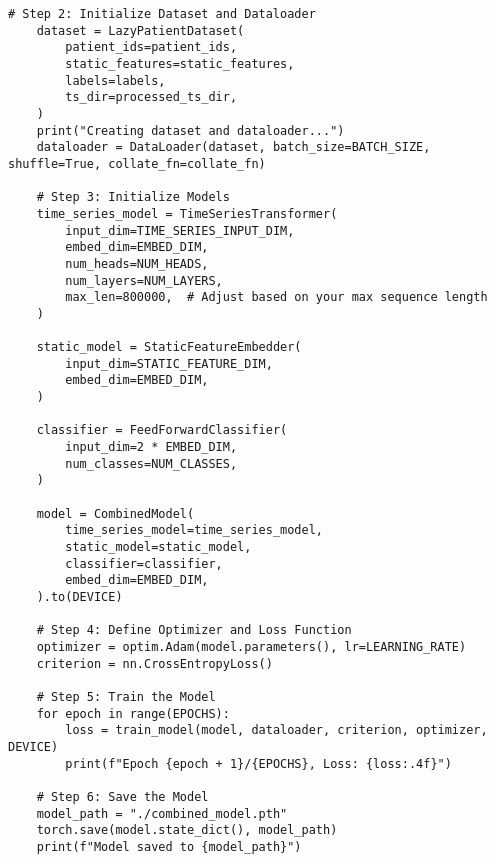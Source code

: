 \begin{appendices}
\begin{mdframed}
\begin{lstlisting}[breaklines=true]
    # Step 2: Initialize Dataset and Dataloader
    dataset = LazyPatientDataset(
        patient_ids=patient_ids,
        static_features=static_features,
        labels=labels,
        ts_dir=processed_ts_dir,
    )
    print("Creating dataset and dataloader...")
    dataloader = DataLoader(dataset, batch_size=BATCH_SIZE, shuffle=True, collate_fn=collate_fn)

    # Step 3: Initialize Models
    time_series_model = TimeSeriesTransformer(
        input_dim=TIME_SERIES_INPUT_DIM,
        embed_dim=EMBED_DIM,
        num_heads=NUM_HEADS,
        num_layers=NUM_LAYERS,
        max_len=800000,  # Adjust based on your max sequence length
    )

    static_model = StaticFeatureEmbedder(
        input_dim=STATIC_FEATURE_DIM,
        embed_dim=EMBED_DIM,
    )

    classifier = FeedForwardClassifier(
        input_dim=2 * EMBED_DIM,
        num_classes=NUM_CLASSES,
    )

    model = CombinedModel(
        time_series_model=time_series_model,
        static_model=static_model,
        classifier=classifier,
        embed_dim=EMBED_DIM,
    ).to(DEVICE)

    # Step 4: Define Optimizer and Loss Function
    optimizer = optim.Adam(model.parameters(), lr=LEARNING_RATE)
    criterion = nn.CrossEntropyLoss()

    # Step 5: Train the Model
    for epoch in range(EPOCHS):
        loss = train_model(model, dataloader, criterion, optimizer, DEVICE)
        print(f"Epoch {epoch + 1}/{EPOCHS}, Loss: {loss:.4f}")

    # Step 6: Save the Model
    model_path = "./combined_model.pth"
    torch.save(model.state_dict(), model_path)
    print(f"Model saved to {model_path}")


    \end{lstlisting}
    \end{mdframed}

  
\end{appendices}